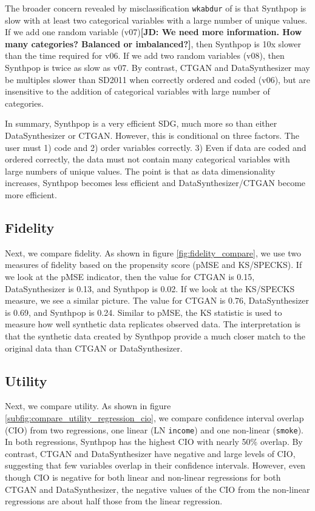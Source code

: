 \documentclass[runningheads]{llncs}
\newcommand{\jd}[1]{\scriptsize {\bf \color{red}[JD: #1]}\normalsize}
\begin{document}
The broader concern revealed by misclassification \texttt{wkabdur} of is that Synthpop is slow with at least two categorical variables with a large number of unique values.  If we add one random variable (v07)\jd{We need more information. How many categories? Balanced or imbalanced?}, then Synthpop is 10x slower than the time required for v06.  If we add two random variables (v08), then Synthpop is twice as slow as v07.  By contrast, CTGAN and DataSynthesizer may be multiples slower than SD2011 when correctly ordered and coded (v06), but are insensitive to the addition of categorical variables with large number of categories.  

In summary, Synthpop is a very efficient SDG, much more so than either DataSynthesizer or CTGAN.  However, this is conditional on three factors.  The user must 1) code and 2) order variables correctly.  3) Even if data are coded and ordered correctly, the data must not contain many categorical variables with large numbers of unique values.  The point is that as data dimensionality increases, Synthpop becomes less efficient and DataSynthesizer/CTGAN become more efficient.

\subsection{Fidelity}

Next, we compare fidelity.  As shown in figure \ref{fig:fidelity_compare}, we use two measures of fidelity based on the propensity score (pMSE and KS/SPECKS).  If we look at the pMSE indicator, then the value for CTGAN is 0.15, DataSynthesizer is 0.13, and Synthpop is 0.02.  If we look at the KS/SPECKS measure, we see a similar picture.  The value for CTGAN is 0.76, DataSynthesizer is 0.69, and Synthpop is 0.24.  Similar to pMSE, the KS statistic is used to measure how well synthetic data replicates observed data.  The interpretation is that the synthetic data created by Synthpop provide a much closer match to the original data than CTGAN or DataSynthesizer.  

\subsection{Utility}

Next, we compare utility.  As shown in figure \ref{subfig:compare_utility_regression_cio}, we compare confidence interval overlap (CIO) from two regressions, one linear (LN \texttt{income}) and one non-linear (\texttt{smoke}).  In both regressions, Synthpop has the highest CIO with nearly 50\% overlap.  By contrast, CTGAN and DataSynthesizer have negative and large levels of CIO, suggesting that few variables overlap in their confidence intervals.  However, even though CIO is negative for both linear and non-linear regressions for both CTGAN and DataSynthesizer, the negative values of the CIO from the non-linear regressions are about half those from the linear regression.  
\end{document}
